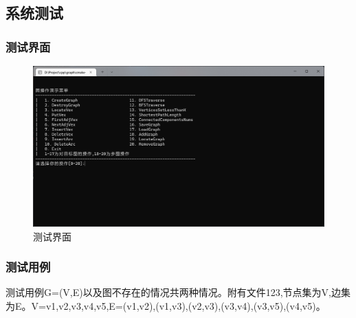 \documentclass[supercite]{HustGraduPaper}
\theoremstyle{definition}
\begin{document}
\subsection{系统测试}
\subsubsection{测试界面}
\begin{figure}[htb] %
	\begin{center}
		\includegraphics[scale=0.5]{images/p2-1.png}
		\caption{测试界面}
		\label{fig2-1}
	\end{center}
\end{figure}
\subsubsection{测试用例}
测试用例G=(V,E)以及图不存在的情况共两种情况。附有文件123,节点集为V,边集为E。V={v1,v2,v3,v4,v5},E={(v1,v2),(v1,v3),(v2,v3),(v3,v4),(v3,v5),(v4,v5)}。
\newpage
\end{document}

